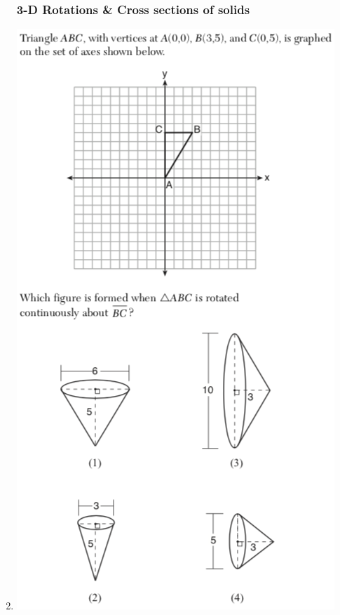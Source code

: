 \documentclass[12pt, twoside]{article}
\begin{document}
\begin{enumerate}
\subsubsection*{3-D Rotations \& Cross sections of solids}
\item %
    \includegraphics[scale=0.75]{triangle_3d_rotation_JN2018.png}

\newpage


\end{enumerate}
\end{document}
